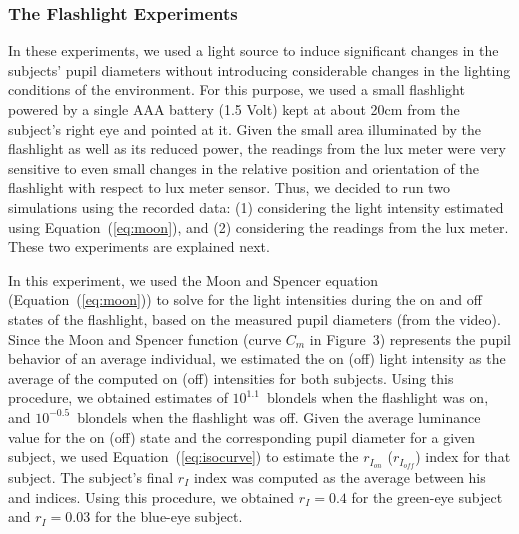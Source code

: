 \documentclass{acmtog}
\begin{document}
\subsubsection{The Flashlight Experiments}
\label{sec:first_flashlightExperiment}

In these experiments, we used a light source to induce significant changes in the subjects' pupil diameters without introducing considerable changes in the
 lighting conditions of the environment. For this purpose, we used a small flashlight  powered by a single AAA battery
(1.5 Volt) kept at about 20cm from the subject's right eye and pointed at it. 
Given the small area illuminated by the flashlight as well as its reduced power, the readings from the lux meter were very
sensitive to even small changes in the relative position and orientation of the flashlight with respect to lux meter
sensor. Thus, we decided to run two simulations using the recorded data: (1) considering the light intensity estimated
using Equation~(\ref{eq:moon}), and (2) considering the readings from the lux meter. These two experiments are explained
next.

In this experiment, we used the Moon and Spencer equation (Equation~(\ref{eq:moon})) to solve for the light intensities
during the {on} and {off} states of the flashlight, based on the measured pupil diameters (from the video).
Since the Moon and Spencer function (curve $C_m$ in Figure~3) represents the pupil behavior of an
average individual, we estimated the {on} ({off}) light intensity as the average of the computed {on}
({off}) intensities for both subjects. Using this procedure, we obtained estimates of $10^{1.1}$~blondels when the
flashlight was on, and $10^{-0.5}$~blondels when the flashlight was off.  Given the average luminance value for the
{on} ({off}) state and the {corresponding} pupil diameter for a given subject, we used Equation~(\ref{eq:isocurve})
to estimate the $r_{I_{on}}$ ($r_{I_{off}}$) index for that subject. The subject's final $r_I$ index was computed as the
average between his  and  indices. Using this procedure, we
obtained $r_I = 0.4$ for the green-eye subject and $r_I = 0.03$  for the blue-eye subject.   
\end{document}
